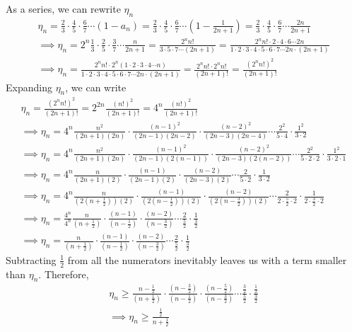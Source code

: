 As a series, we can rewrite $\eta_n$
\begin{gather*}
\eta_n = \frac{2}{3}\cdot\frac{4}{5}\cdot\frac{6}{7}\cdots(1-a_n) = \frac{2}{3}\cdot\frac{4}{5}\cdot\frac{6}{7}\cdots(1-\frac{1}{2n+1}) = \frac{2}{3}\cdot\frac{4}{5}\cdot\frac{6}{7}\cdots\frac{2n}{2n+1}\\
\implies \eta_n =  2^n\frac{1}{3}\cdot\frac{2}{5}\cdot\frac{3}{7}\cdots\frac{n}{2n+1} = \frac{2^n n!}{3\cdot5\cdot7\cdots(2n+1)} =  \frac{2^n n!\cdot2\cdot4\cdot6\cdots2n}{1\cdot2\cdot3\cdot4\cdot5\cdot6\cdot7\cdots2n\cdot(2n+1)}\\
\implies \eta_n =  \frac{2^n n!\cdot2^n(1\cdot2\cdot3\cdot4\cdots n)}{1\cdot2\cdot3\cdot4\cdot5\cdot6\cdot7\cdots2n\cdot(2n+1)} = \frac{2^n n!\cdot 2^n n!}{(2n+1)!} = \frac{(2^n n!)^2}{(2n+1)!}
\end{gather*}
Expanding $\eta_n$, we can write
\begin{gather*}
\eta_n = \frac{(2^n n!)^2}{(2n+1)!} = 2^{2n}\frac{(n!)^2}{(2n+1)!} = 4^{n}\frac{(n!)^2}{(2n+1)!}\\
\implies \eta_n = 4^n \frac{n^2}{(2n+1)(2n)}\cdot\frac{(n-1)^2}{(2n-1)(2n-2)}\cdot\frac{(n-2)^2}{(2n-3)(2n-4)}\cdots\frac{2^2}{5\cdot4}\cdot\frac{1^2}{3\cdot2}\\
\implies \eta_n = 4^n \frac{n^2}{(2n+1)(2n)}\cdot\frac{(n-1)^2}{(2n-1)(2(n-1))}\cdot\frac{(n-2)^2}{(2n-3)(2(n-2))}\cdots\frac{2^2}{5\cdot2\cdot2}\cdot\frac{1^2}{3\cdot2\cdot1}\\
\implies \eta_n = 4^n \frac{n}{(2n+1)(2)}\cdot\frac{(n-1)}{(2n-1)(2)}\cdot\frac{(n-2)}{(2n-3)(2)}\cdots\frac{2}{5\cdot2}\cdot\frac{1}{3\cdot2}\\
\implies \eta_n = 4^n \frac{n}{(2(n+\frac{1}{2}))(2)}\cdot\frac{(n-1)}{(2(n-\frac{1}{2}))(2)}\cdot\frac{(n-2)}{(2(n-\frac{3}{2}))(2)}\cdots\frac{2}{2\cdot\frac{5}{2}\cdot2}\cdot\frac{1}{2\cdot\frac{3}{2}\cdot2}\\
\implies \eta_n = \frac{4^n}{4^n} \frac{n}{(n+\frac{1}{2})}\cdot\frac{(n-1)}{(n-\frac{1}{2})}\cdot\frac{(n-2)}{(n-\frac{3}{2})}\cdots\frac{2}{\frac{5}{2}}\cdot\frac{1}{\frac{3}{2}}\\
\implies \eta_n = \frac{n}{(n+\frac{1}{2})}\cdot\frac{(n-1)}{(n-\frac{1}{2})}\cdot\frac{(n-2)}{(n-\frac{3}{2})}\cdots\frac{2}{\frac{5}{2}}\cdot\frac{1}{\frac{3}{2}}
\end{gather*}
Subtracting $\frac{1}{2}$ from all the numerators inevitably leaves us with a term smaller than $\eta_n$. Therefore,
\begin{gather*}
\eta_n \ge\frac{n-\frac{1}{2}}{(n+\frac{1}{2})}\cdot\frac{(n-\frac{3}{2})}{(n-\frac{1}{2})}\cdot\frac{(n-\frac{5}{2})}{(n-\frac{3}{2})}\cdots\frac{\frac{3}{2}}{\frac{5}{2}}\cdot\frac{\frac{1}{2}}{\frac{3}{2}}\\
\implies \eta_n \ge \frac{\frac{1}{2}}{n+\frac{1}{2}}
\end{gather*}

